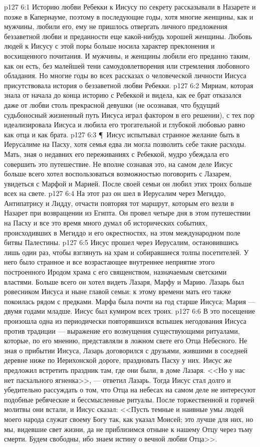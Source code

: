 \vs p127 6:1 Историю любви Ребекки к Иисусу по секрету рассказывали в Назарете и позже в Капернауме, поэтому в последующие годы, хотя многие женщины, как и мужчины, любили его, ему не пришлось отвергать личного предложения беззаветной любви и преданности еще какой\hyp{}нибудь хорошей женщины. Любовь людей к Иисусу с этой поры больше носила характер преклонения и восхищенного почитания. И мужчины, и женщины любили его преданно таким, как он есть, без малейшей тени самоудовлетворения или стремления любовного обладания. Но многие годы во всех рассказах о человеческой личности Иисуса присутствовала история о беззаветной любви Ребекки.
\vs p127 6:2 Мириам, которая знала от начала до конца историю с Ребеккой и видела, как ее брат отказался даже от любви столь прекрасной девушки (не осознавая, что будущий судьбоносный жизненный путь Иисуса играл фактором в его решении), с тех пор идеализировала Иисуса и любила его трогательной и глубокой любовью равно как отца и как брата.
\vs p127 6:3 \P\ Иисус испытывал странное желание быть в Иерусалиме на Пасху, хотя семья едва ли могла позволить себе такие расходы. Мать, зная о недавних его переживаниях с Ребеккой, мудро убеждала его совершить это путешествие. Не вполне сознавая это, на самом деле Иисус больше всего хотел воспользоваться возможностью поговорить с Лазарем, увидеться с Марфой и Марией. После своей семьи он любил этих троих больше всех на свете.
\vs p127 6:4 На этот раз он шел в Иерусалим через Мегиддо, Антипатрису и Лидду, отчасти повторяя тот маршрут, которым его везли в Назарет при возвращении из Египта. Он провел четыре дня в этом путешествии на Пасху и все это время много думал об исторических событиях, происходивших в Мегиддо и его окрестностях, на этом международном поле битвы Палестины.
\vs p127 6:5 Иисус прошел через Иерусалим, остановившись лишь один раз, чтобы взглянуть на храм и собиравшиеся толпы посетителей. У него было странное и все возрастающее внутреннее неприятие этого построенного Иродом храма с его священством, назначаемым светскими властями. Больше всего он хотел видеть Лазаря, Марфу и Марию. Лазарь был ровесником Иисуса и ныне главой семьи: к этому времени мать его также покоилась рядом с предками. Марфа была почти на год старше Иисуса; Мария --- двумя годами младше. Иисус был кумиром всех троих.
\vs p127 6:6 В это посещение произошла одна из периодически повторявшихся вспышек негодования Иисуса против традиции --- выражение его возмущения существующими ритуалами, которые, по его мнению, представляли в ложном свете его Отца Небесного. Не зная о прибытии Иисуса, Лазарь договорился с друзьями, жившими в соседней деревне ниже по Иерихонской дороге, праздновать Пасху у них. Иисус же предложил встретить праздник там, где они были, в доме Лазаря. <<Но у нас нет пасхального ягненка>>, --- ответил Лазарь. Тогда Иисус стал долго и убедительно рассуждать о том, что Отца на небесах на самом деле не интересуют подобные ребяческие и бессмысленные ритуалы. После торжественной и горячей молитвы они встали, и Иисус сказал: <<Пусть темные и наивные умы людей моего народа служат своему Богу так, как указал Моисей; это лучше для них, но мы, видевшие свет жизни, да не приблизимся отныне к нашему Отцу через тьму смерти. Будем свободны, ибо знаем истину о вечной любви Отца>>.
